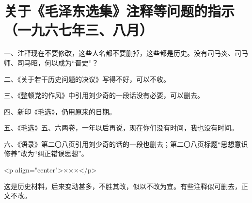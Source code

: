 \section[关于《毛泽东选集》注释等问题的指示（一九六七年三、八月）]{关于《毛泽东选集》注释等问题的指示（一九六七年三、八月）}


一、注释现在不要修改，这些人名都不要删掉，这些都是历史。没有司马炎、司马师、司马昭，何以成为“晋史”？

二、《关于若干历史问题的决议》写得不好，可以不收。

三、《整顿党的作风》中引用刘少奇的一段话没有必要，可以删去。

四、新印《毛选》，仍用原来的日期。

五、《毛选》五、六两卷，一年以后再说，现在你们没有时间，我也没有时间。

六、《语录》第二〇八页引用刘少奇的话的一段也删去；第二〇八页标题“思想意识修养”改为“纠正错误思想”。


<p align="center">×××</p>

这是历史材料，后来变动甚多，不胜其改，似以不改为宜。有些注释似可删去，正文不改。




